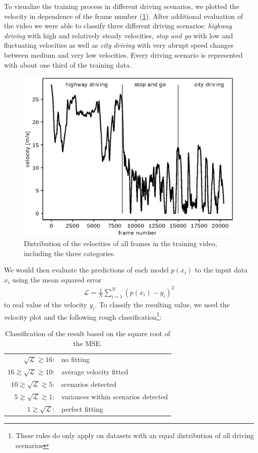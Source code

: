 \documentclass[conference]{IEEEtran}
\begin{document}
To visualize the training process in different driving scenarios, we plotted the velocity in dependence of the frame number (\cref{fig:SpeedPerFrameDistributionNewSplitting}). After additional evaluation of the video we were able to classify three different driving scenarios: \emph{highway driving} with high and relatively steady velocities, \emph{stop and go} with low and fluctuating velocities as well as \emph{city driving} with very abrupt speed changes between medium and very low velocities. Every driving scenario is represented with about one third of the training data.

\begin{figure}[ht]
	\centering
	\includegraphics[scale=0.55]{./imgs/plot_speed_time_new_splitting.eps}
	\caption{Distribution of the velocities of all frames in the training video, including the three categories.}
	\label{fig:SpeedPerFrameDistributionNewSplitting}
\end{figure}

We would then evaluate the predictions of each model $p(x_i)$ to the input data $x_i$ using the mean squared error
\begin{align}
	\mathcal{L} = \frac{1}{N} \sum\limits_{i=1}^{N} (p(x_i) - y_i)^2
\end{align}
to real value of the velocity $y_i$. To classify the resulting value, we used the velocity plot and the 
following rough classification\footnote{These rules do only apply on datasets with an equal distribution 
of all driving scenarios}:
\begin{table}[h!]
\normalsize
\centering
\begin{tabular}{r l}
$\sqrt{\mathcal{L}} \gtrsim 16$: & no fitting\\
$16 \gtrsim \sqrt{\mathcal{L}} \gtrsim 10$: & average velocity fitted\\
$10 \gtrsim \sqrt{\mathcal{L}} \gtrsim 5$: & scenarios detected\\
$5 \gtrsim \sqrt{\mathcal{L}} \gtrsim 1$: & variances within scenarios detected\\
$1 \gtrsim \sqrt{\mathcal{L}}$: & perfect fitting
\end{tabular}
\caption{Classification of the result based on the square root of the MSE.}
\end{table}
\end{document}
